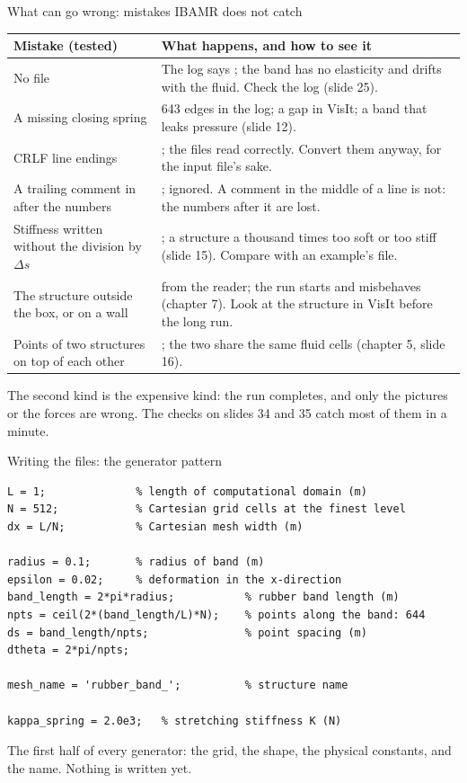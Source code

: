 \documentclass[aspectratio=169,11pt]{beamer}
\begin{document}
\begin{frame}{What can go wrong: mistakes IBAMR does not catch}
\scriptsize
\begin{tabular}{@{}L{0.34\textwidth}L{0.58\textwidth}@{}}
\toprule
Mistake (tested) & What happens, and how to see it\\
\midrule
No  file &  The log says ; the band has no elasticity and drifts with the fluid. Check the log (slide 25).\\
A missing closing spring &  643 edges in the log; a gap in VisIt; a band that leaks pressure (slide 12).\\
CRLF line endings & ; the files read correctly. Convert them anyway, for the input file's sake.\\
A trailing comment in  after the numbers & ; ignored. A comment in the middle of a line is not: the numbers after it are lost.\\
Stiffness written without the division by $\Delta s$ & ; a structure a thousand times too soft or too stiff (slide 15). Compare with an example's file.\\
The structure outside the box, or on a wall &  from the reader; the run starts and misbehaves (chapter 7). Look at the structure in VisIt before the long run.\\
Points of two structures on top of each other & ; the two share the same fluid cells (chapter 5, slide 16).\\
\bottomrule
\end{tabular}
\vspace{2mm}
\small The second kind is the expensive kind: the run completes, and only the pictures or the forces are wrong. The checks on slides 34 and 35 catch most of them in a minute.
\end{frame}

\begin{frame}[fragile]{Writing the files: the generator pattern}
\begin{lstlisting}[style=matlab,basicstyle=\ttfamily\tiny\color{BlackGray}]
% generate_mesh2d.m (IB/01): the constants
L = 1;              % length of computational domain (m)
N = 512;            % Cartesian grid cells at the finest level
dx = L/N;           % Cartesian mesh width (m)

radius = 0.1;       % radius of band (m)
epsilon = 0.02;     % deformation in the x-direction
band_length = 2*pi*radius;           % rubber band length (m)
npts = ceil(2*(band_length/L)*N);    % points along the band: 644
ds = band_length/npts;               % point spacing (m)
dtheta = 2*pi/npts;

mesh_name = 'rubber_band_';          % structure name

kappa_spring = 2.0e3;   % stretching stiffness K (N)
\end{lstlisting}
\small The first half of every generator: the grid, the shape, the physical constants, and the name. Nothing is written yet.
\end{frame}
\end{document}
